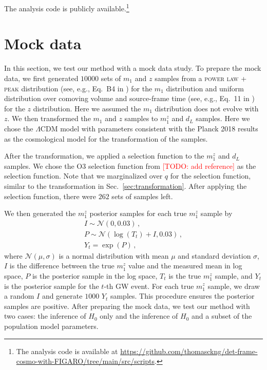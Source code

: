 \documentclass[twocolumn]{aastex631}
\newcommand{\todo}[1]{\textcolor{red}{[TODO: #1]}}
\begin{document}
The analysis code is publicly available.\footnote{The analysis code is available at \url{https://github.com/thomasckng/det-frame-cosmo-with-FIGARO/tree/main/src/scripts}.}

\section{Mock data}
\label{sec:mock_data}

In this section, we test our method with a mock data study.
To prepare the mock data, we first generated $10000$ sets of $m_1$ and $z$ samples from a \textsc{power law + peak} distribution (see, e.g., Eq.~B4 in \cite{KAGRA:2021duu}) for the $m_1$ distribution and uniform distribution over comoving volume and source-frame time (see, e.g., Eq.~11 in \citet{LIGOScientific:2019zcs}) for the $z$ distribution.
Here we assumed the $m_1$ distribution does not evolve with $z$.
We then transformed the $m_1$ and $z$ samples to $m^z_1$ and $d_L$ samples.
Here we chose the $\Lambda$CDM model with parameters consistent with the Planck 2018 results \citep{Planck:2018vyg} as the cosmological model for the transformation of the samples.

After the transformation, we applied a selection function to the $m^z_1$ and $d_L$ samples.
We chose the O3 selection function from \todo{add reference} as the selection function.
Note that we marginalized over $q$ for the selection function, similar to the transformation in Sec.~\ref{sec:transformation}.
After applying the selection function, there were $262$ sets of samples left.

We then generated the $m^z_1$ posterior samples for each true $m^z_1$ sample by
\begin{gather*}
    I \sim \mathcal{N}(0, 0.03)\,,\\
    P \sim \mathcal{N}(\log(T_t)+I, 0.03)\,,\\
    Y_t = \exp(P)\,,
\end{gather*}
where $\mathcal{N}(\mu, \sigma)$ is a normal distribution with mean $\mu$ and standard deviation $\sigma$, $I$ is the difference between the true $m^z_1$ value and the measured mean in log space, $P$ is the posterior sample in the log space, $T_t$ is the true $m^z_1$ sample, and $Y_t$ is the posterior sample for the $t$-th \ac{GW} event.
For each true $m^z_1$ sample, we draw a random $I$ and generate $1000$ $Y_t$ samples.
This procedure ensures the posterior samples are positive.
After preparing the mock data, we test our method with two cases: the inference of $H_0$ only and the inference of $H_0$ and a subset of the population model parameters.
\end{document}
